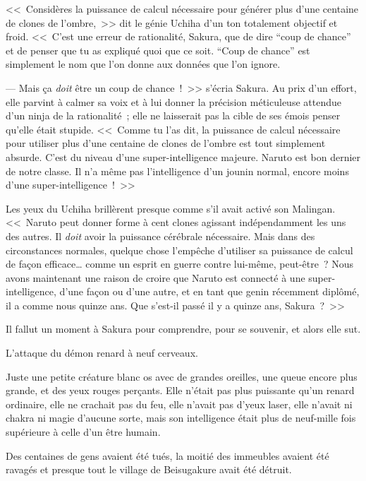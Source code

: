\clearpage
{}

<<~Considères la puissance de calcul nécessaire pour générer plus d'une centaine de clones de l'ombre,~>> dit le génie Uchiha d'un ton totalement objectif et froid. <<~C'est une erreur de rationalité, Sakura, que de dire “coup de chance” et de penser que tu as expliqué quoi que ce soit. “Coup de chance” est simplement le nom que l'on donne aux données que l'on ignore.

--- Mais ça \emph{doit} être un coup de chance~!~>> s'écria Sakura. Au prix d'un effort, elle parvint à calmer sa voix et à lui donner la précision méticuleuse attendue d'un ninja de la rationalité~; elle ne laisserait pas la cible de ses émois penser qu'elle était stupide. <<~Comme tu l'as dit, la puissance de calcul nécessaire pour utiliser plus d'une centaine de clones de l'ombre est tout simplement absurde. C'est du niveau d'une super-intelligence majeure. Naruto est bon dernier de notre classe. Il n'a même pas l'intelligence d'un jounin normal, encore moins d'une super-intelligence~!~>>

Les yeux du Uchiha brillèrent presque comme s'il avait activé son Malingan. <<~Naruto peut donner forme à cent clones agissant indépendamment les uns des autres. Il \emph{doit} avoir la puissance cérébrale nécessaire. Mais dans des circonstances normales, quelque chose l'empêche d'utiliser sa puissance de calcul de façon efficace… comme un esprit en guerre contre lui-même, peut-être~? Nous avons maintenant une raison de croire que Naruto est connecté à une super-intelligence, d'une façon ou d'une autre, et en tant que genin récemment diplômé, il a comme nous quinze ans. Que s'est-il passé il y a quinze ans, Sakura~?~>>

Il fallut un moment à Sakura pour comprendre, pour se souvenir, et alors elle sut.

L'attaque du démon renard à neuf cerveaux.

Juste une petite créature blanc os avec de grandes oreilles, une queue encore plus grande, et des yeux rouges perçants. Elle n'était pas plus puissante qu'un renard ordinaire, elle ne crachait pas du feu, elle n'avait pas d'yeux laser, elle n'avait ni chakra ni magie d'aucune sorte, mais son intelligence était plus de neuf-mille fois supérieure à celle d'un être humain.

Des centaines de gens avaient été tués, la moitié des immeubles avaient été ravagés et presque tout le village de Beisugakure avait été détruit.

